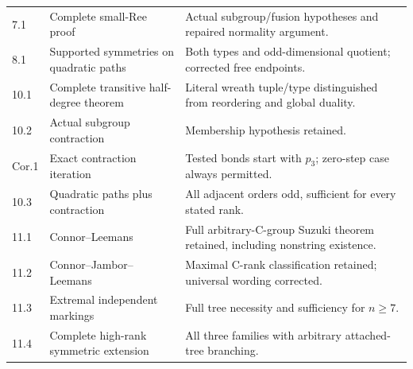 \documentclass[11pt]{article}
\begin{document}
\begin{longtable}{@{}p{17mm}p{45mm}p{91mm}@{}}
7.1 & Complete small-Ree proof & Actual subgroup/fusion hypotheses and repaired normality argument.\\
8.1 & Supported symmetries on quadratic paths & Both types and odd-dimensional quotient; corrected free endpoints.\\
10.1 & Complete transitive half-degree theorem & Literal wreath tuple/type distinguished from reordering and global duality.\\
10.2 & Actual subgroup contraction & Membership hypothesis retained.\\
Cor.1 & Exact contraction iteration & Tested bonds start with $p_3$; zero-step case always permitted.\\
10.3 & Quadratic paths plus contraction & All adjacent orders odd, sufficient for every stated rank.\\
11.1 & Connor--Leemans & Full arbitrary-C-group Suzuki theorem retained, including nonstring existence.\\
11.2 & Connor--Jambor--Leemans & Maximal C-rank classification retained; universal wording corrected.\\
11.3 & Extremal independent markings & Full tree necessity and sufficiency for $n\ge7$.\\
11.4 & Complete high-rank symmetric extension & All three families with arbitrary attached-tree branching.\\\bottomrule
\end{longtable}
\normalsize
\end{document}
